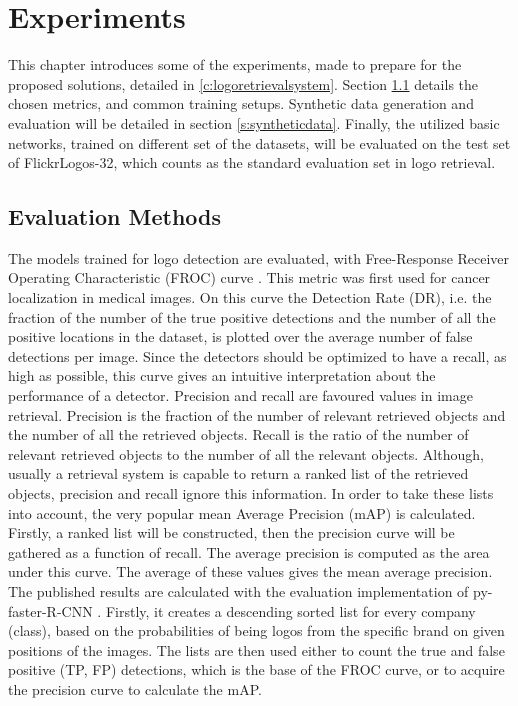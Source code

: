\chapter{Experiments}\label{c:experiments}

This chapter introduces some of the experiments, made to prepare for the proposed solutions, detailed in \ref{c:logoretrievalsystem}. Section \ref{s:evaluationmethods} details the chosen metrics, and common training setups. Synthetic data generation and evaluation will be detailed in section \ref{s:syntheticdata}. Finally, the utilized basic networks, trained on different set of the datasets, will be evaluated on the test set of FlickrLogos-32, which counts as the standard evaluation set in logo retrieval.
\bigbreak
\section{Evaluation Methods}\label{s:evaluationmethods}
The models trained for logo detection are evaluated, with Free-Response Receiver Operating Characteristic (FROC) curve \cite{MillerTheFROC1969}. This metric was first used for cancer localization in medical images. On this curve the Detection Rate (DR), i.e. the fraction of the number of the true positive detections and the number of all the positive locations in the dataset, is plotted over the average number of false detections per image. Since the detectors should be optimized to have a recall, as high as possible, this curve gives an intuitive interpretation about the performance of a detector.
\bigbreak
Precision and recall are favoured values in image retrieval. Precision is the fraction of the number of relevant retrieved objects and the number of all the retrieved objects. Recall is the ratio of the number of relevant retrieved objects to the number of all the relevant objects. Although, usually a retrieval system is capable to return a ranked list of the retrieved objects, precision and recall ignore this information. In order to take these lists into account, the very popular mean Average Precision (mAP) is calculated. Firstly, a ranked list will be constructed, then the precision curve will be gathered as a function of recall. The average precision is computed as the area under this curve. The average of these values gives the mean average precision.
\bigbreak
The published results are calculated with the evaluation implementation of py-faster-R-CNN \cite{Girshick2017} \cite{NIPS2015_5638}. Firstly, it creates a descending sorted list for every company (class), based on the probabilities of being logos from the specific brand on given positions of the images. The lists are then used either to count the true and false positive (TP, FP) detections, which is the base of the FROC curve, or to acquire the precision curve to calculate the mAP.
